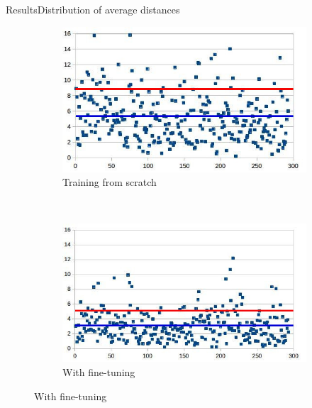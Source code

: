 \documentclass[10pt,svgnames]{beamer}
\begin{document}
\begin{frame}{Results}{Distribution of average distances}
\begin{itemize}
{\begin{figure}[htbp]
\begin{subfigure}[t]{0.5\textwidth}
        			\centering
        			\includegraphics[scale=.4]{images/lm6_cnn_2}
        			\caption{Training from scratch}
    			\end{subfigure}%
    			~ 
    			\begin{subfigure}[t]{0.5\textwidth}
        			\centering
        			\includegraphics[scale=.38]{images/lm6_finetuning_2}
        			\caption{With fine-tuning}
    			\end{subfigure}    		
			\end{figure}
		}
	\end{itemize}

\end{frame}
\end{document}
